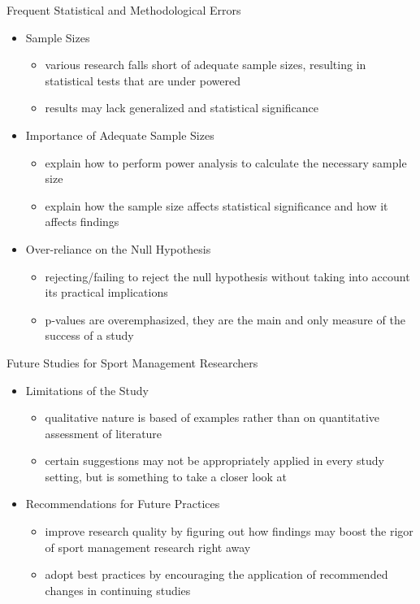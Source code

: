 \documentclass[aspectratio=169, 12pt]{beamer}
\begin{document}
\begin{frame}{Frequent Statistical and Methodological Errors}
  \begin{itemize}
      \item Sample Sizes
        \begin{itemize}
            \item various research falls short of adequate sample sizes, resulting in statistical tests that are under powered
            \item results may lack generalized and statistical significance
        \end{itemize}
      \item Importance of Adequate Sample Sizes
        \begin{itemize}
            \item explain how to perform power analysis to calculate the necessary sample size
            \item explain how the sample size affects statistical significance and how it affects findings
        \end{itemize}
      \item Over-reliance on the Null Hypothesis
        \begin{itemize}
            \item rejecting/failing to reject the null hypothesis without taking into account its practical implications
            \item p-values are overemphasized, they are the main and only measure of the success of a study
        \end{itemize}
  \end{itemize}
\end{frame}


\begin{frame}{Future Studies for Sport Management Researchers}
  \begin{itemize}
      \item Limitations of the Study
        \begin{itemize}
            \item qualitative nature is based of examples rather than on quantitative assessment of literature
            \item certain suggestions may not be appropriately applied in every study setting, but is something to take a closer look at
        \end{itemize}
      \item Recommendations for Future Practices
        \begin{itemize}
            \item improve research quality by figuring out how findings may boost the rigor of sport management research right away
            \item adopt best practices by encouraging the application of recommended changes in continuing studies
        \end{itemize}
  \end{itemize}
\end{frame}
\end{document}
